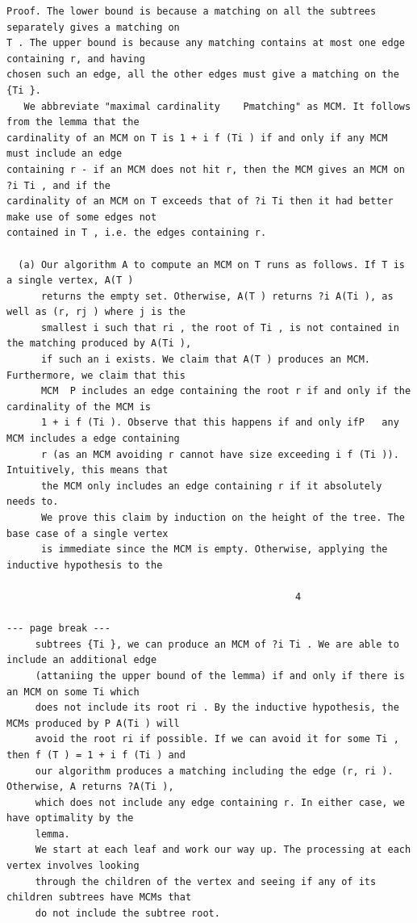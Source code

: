 \documentclass[12pt]{article}
\begin{document}
\begin{Verbatim}[breaklines=true,fontsize=\small]
Proof. The lower bound is because a matching on all the subtrees separately gives a matching on
T . The upper bound is because any matching contains at most one edge containing r, and having
chosen such an edge, all the other edges must give a matching on the {Ti }.
   We abbreviate "maximal cardinality    Pmatching" as MCM. It follows from the lemma that the
cardinality of an MCM on T is 1 + i f (Ti ) if and only if any MCM must include an edge
containing r - if an MCM does not hit r, then the MCM gives an MCM on ?i Ti , and if the
cardinality of an MCM on T exceeds that of ?i Ti then it had better make use of some edges not
contained in T , i.e. the edges containing r.

  (a) Our algorithm A to compute an MCM on T runs as follows. If T is a single vertex, A(T )
      returns the empty set. Otherwise, A(T ) returns ?i A(Ti ), as well as (r, rj ) where j is the
      smallest i such that ri , the root of Ti , is not contained in the matching produced by A(Ti ),
      if such an i exists. We claim that A(T ) produces an MCM. Furthermore, we claim that this
      MCM  P includes an edge containing the root r if and only if the cardinality of the MCM is
      1 + i f (Ti ). Observe that this happens if and only ifP   any MCM includes a edge containing
      r (as an MCM avoiding r cannot have size exceeding i f (Ti )). Intuitively, this means that
      the MCM only includes an edge containing r if it absolutely needs to.
      We prove this claim by induction on the height of the tree. The base case of a single vertex
      is immediate since the MCM is empty. Otherwise, applying the inductive hypothesis to the

                                                  4

--- page break ---
     subtrees {Ti }, we can produce an MCM of ?i Ti . We are able to include an additional edge
     (attaniing the upper bound of the lemma) if and only if there is an MCM on some Ti which
     does not include its root ri . By the inductive hypothesis, the MCMs produced by P A(Ti ) will
     avoid the root ri if possible. If we can avoid it for some Ti , then f (T ) = 1 + i f (Ti ) and
     our algorithm produces a matching including the edge (r, ri ). Otherwise, A returns ?A(Ti ),
     which does not include any edge containing r. In either case, we have optimality by the
     lemma.
     We start at each leaf and work our way up. The processing at each vertex involves looking
     through the children of the vertex and seeing if any of its children subtrees have MCMs that
     do not include the subtree root.


\end{Verbatim}
\end{document}
